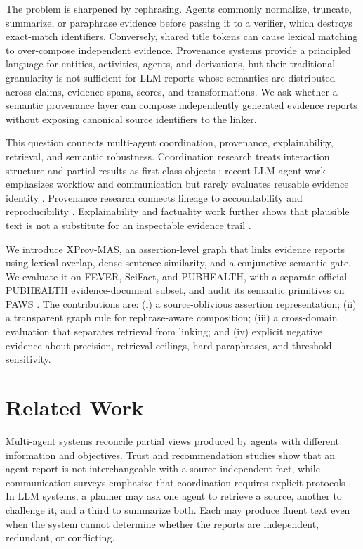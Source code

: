 \documentclass[graybox]{svmult}
\begin{document}
The problem is sharpened by rephrasing. Agents commonly normalize, truncate, summarize, or paraphrase evidence before passing it to a verifier, which destroys exact-match identifiers. Conversely, shared title tokens can cause lexical matching to over-compose independent evidence. Provenance systems provide a principled language for entities, activities, agents, and derivations, but their traditional granularity is not sufficient for LLM reports whose semantics are distributed across claims, evidence spans, scores, and transformations. We ask whether a semantic provenance layer can compose independently generated evidence reports without exposing canonical source identifiers to the linker.

This question connects multi-agent coordination, provenance, explainability, retrieval, and semantic robustness. Coordination research treats interaction structure and partial results as first-class objects \cite{Anont4666174668,Anonm202109996w,Anona8023096336,Anonat201801002}; recent LLM-agent work emphasizes workflow and communication but rarely evaluates reusable evidence identity \cite{Anona6024000092,Anona6023067920}. Provenance research connects lineage to accountability and reproducibility \cite{Anonpdinta00119,Anond0182887201,Anonrone0309210,Anonw002cpe6544,Anont15ea000136,Anoni5901717470,Anont2017704893,w3c2013prov}. Explainability and factuality work further shows that plausible text is not a substitute for an inspectable evidence trail \cite{Anone1453561048,Anones201912012,Anonet201807007,Anond6024074210,Anonf602400881z}.

We introduce XProv-MAS, an assertion-level graph that links evidence reports using lexical overlap, dense sentence similarity, and a conjunctive semantic gate. We evaluate it on FEVER, SciFact, and PUBHEALTH, with a separate official PUBHEALTH evidence-document subset, and audit its semantic primitives on PAWS \cite{thorne2018fever,won2020scifact,kotonya2020pubhealth,zhang2019paws}. The contributions are: (i) a source-oblivious assertion representation; (ii) a transparent graph rule for rephrase-aware composition; (iii) a cross-domain evaluation that separates retrieval from linking; and (iv) explicit negative evidence about precision, retrieval ceilings, hard paraphrases, and threshold sensitivity.

\section{Related Work}

Multi-agent systems reconcile partial views produced by agents with different information and objectives. Trust and recommendation studies show that an agent report is not interchangeable with a source-independent fact, while communication surveys emphasize that coordination requires explicit protocols \cite{Anona580079021x,Anonm202109996w,Anona8023096336}. In LLM systems, a planner may ask one agent to retrieve a source, another to challenge it, and a third to summarize both. Each may produce fluent text even when the system cannot determine whether the reports are independent, redundant, or conflicting.
\end{document}

